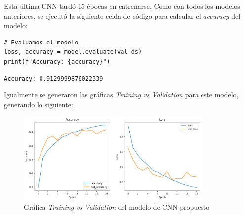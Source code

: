 Esta última CNN tardó 15 épocas en entrenarse. Como con todos los modelos anteriores, se ejecutó la siguiente celda de código para calcular el \textit{accuracy} del modelo:


\begin{lstlisting}[caption={Código para la impresión del \textit{accuracy} del modelo}]
# Evaluamos el modelo
loss, accuracy = model.evaluate(val_ds)
print(f"Accuracy: {accuracy}")
\end{lstlisting}


\begin{lstlisting}[caption={Impresión \textit{accuracy} del modelo}]
Accuracy: 0.9129999876022339
\end{lstlisting}

\newpage

Igualmente se generaron las gráficas \textit{Training vs Validation} para este modelo, generando lo siguiente:

\begin{figure}[H]
    \centering
    \includegraphics[width=0.85\textwidth]{Francisco/Imagenes resultados/TvsVCnn5.png} 
    \caption{Gráfica \textit{Training vs Validation} del modelo de CNN propuesto}
\end{figure}

